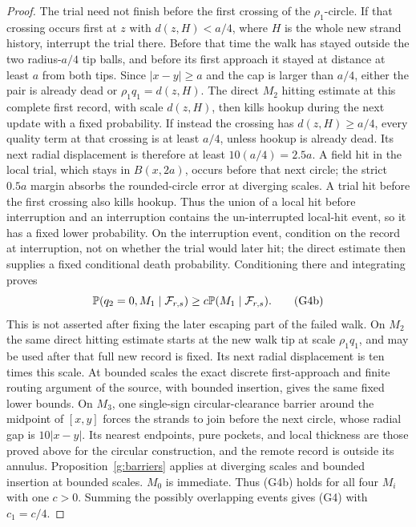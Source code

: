 \begin{proof}
The trial need not finish before the first crossing of the
\(\rho_1\)-circle.  If that crossing occurs first at \(z\) with
\(d(z,H)<a/4\), where \(H\) is the whole new strand history, interrupt
the trial there.  Before that time the walk has stayed outside the two
radius-\(a/4\) tip balls, and before its first approach it stayed at
distance at least \(a\) from both tips.  Since \(|x-y|\ge a\) and the
cap is larger than \(a/4\), either the pair is already dead or
\(\rho_1q_1=d(z,H)\).  The direct \(M_2\) hitting estimate at this
complete first record, with scale \(d(z,H)\), then kills hookup during
the next update with a fixed probability.  If instead the crossing has
\(d(z,H)\ge a/4\), every quality term at that crossing is at least
\(a/4\), unless hookup is already dead.  Its next radial displacement
is therefore at least \(10(a/4)=2.5a\).  A field hit in the local trial,
which stays in \(B(x,2a)\), occurs before that next circle; the strict
\(0.5a\) margin absorbs the rounded-circle error at diverging scales.
A trial hit before the first crossing also kills hookup.  Thus the union
of a local hit before interruption and an interruption contains the
un-interrupted local-hit event, so it has a fixed lower probability.  On
the interruption event, condition on the record at interruption, not on
whether the trial would later hit; the direct estimate then supplies a
fixed conditional death probability.  Conditioning there and integrating
proves
\[
 \mathbb P(q_2=0,M_1\mid{\cal F}_{r,s})
       \ge c\mathbb P(M_1\mid{\cal F}_{r,s}).                    \tag{G4b}
\]
This is not asserted after fixing the later escaping part of the failed
walk.  On \(M_2\) the same direct hitting estimate starts at the new
walk tip at scale \(\rho_1q_1\), and may be used after that full new
record is fixed.  Its next radial displacement is ten times this scale.
At bounded scales the exact discrete first-approach and finite routing
argument of the source, with bounded insertion, gives the same fixed
lower bounds.  On \(M_3\), one
single-sign circular-clearance barrier around the midpoint of \([x,y]\)
forces the strands to join before the next circle, whose radial gap is
\(10|x-y|\).  Its nearest endpoints, pure pockets, and local thickness
are those proved above for the circular construction, and the remote record
is outside its annulus.  Proposition~\ref{g:barriers} applies at diverging
scales and bounded insertion at bounded scales.  \(M_0\) is immediate.
Thus (G4b) holds for all four \(M_i\) with one \(c>0\).  Summing the
possibly overlapping events gives (G4) with \(c_1=c/4\).


\end{proof}
